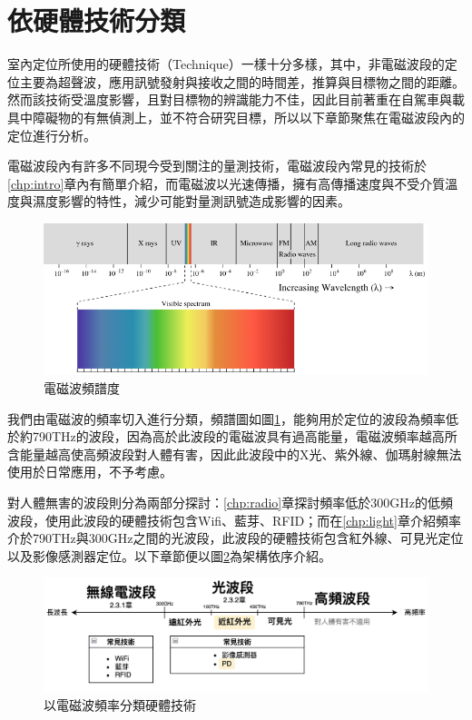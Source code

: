 \section{依硬體技術分類}
\label{chp:technique}

    室內定位所使用的硬體技術（Technique）一樣十分多樣，其中，非電磁波段的定位主要為超聲波，應用訊號發射與接收之間的時間差，推算與目標物之間的距離。然而該技術受溫度影響，且對目標物的辨識能力不佳，因此目前著重在自駕車與載具中障礙物的有無偵測上\cite{survey_ultrasonic}，並不符合研究目標，所以以下章節聚焦在電磁波段內的定位進行分析。

    電磁波段內有許多不同現今受到關注的量測技術，電磁波段內常見的技術於\ref{chp:intro}章內有簡單介紹，而電磁波以光速傳播，擁有高傳播速度與不受介質溫度與濕度影響的特性，減少可能對量測訊號造成影響的因素。

    \begin{figure}[htpb]
        \centering
        \includegraphics[width=15cm]{ch2pic/electro_spectrum.png}
        \caption{電磁波頻譜度\cite{Spectrum}}
        \label{pic:spectrum}
    \end{figure}

    我們由電磁波的頻率切入進行分類，頻譜圖如圖\ref{pic:spectrum}，能夠用於定位的波段為頻率低於約790THz的波段，因為高於此波段的電磁波具有過高能量，電磁波頻率越高所含能量越高使高頻波段對人體有害，因此此波段中的X光、紫外線、伽瑪射線無法使用於日常應用，不予考慮。

    對人體無害的波段則分為兩部分探討：\ref{chp:radio}章探討頻率低於300GHz的低頻波段\cite{book_electromagnetic}，使用此波段的硬體技術包含Wifi、藍芽、RFID；而在\ref{chp:light}章介紹頻率介於790THz與300GHz之間的光波段，此波段的硬體技術包含紅外線、可見光定位以及影像感測器定位。以下章節便以圖\ref{pic:electro_sort}為架構依序介紹。


    \begin{figure}[htpb]
        \centering
        \includegraphics[width=15cm]{ch2pic/electro_sort.png}
        \caption{以電磁波頻率分類硬體技術}
        \label{pic:electro_sort}
    \end{figure}

